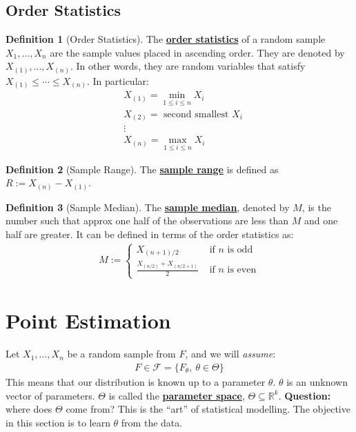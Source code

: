 \documentclass[11pt]{scrartcl}
\newcommand{\R}[0]{\mathbb{R}}
\theoremstyle{definition}
\newtheorem{definition}{Definition}
\theoremstyle{remark}
\newcommand{\dfn}[1]{\textbf{\underline{#1}}}
\newcommand{\dist}[0]{\mathcal{F}}
\begin{document}
{\subsection{Order Statistics}
\begin{definition}[Order Statistics]
	The \dfn{order statistics} of a random sample $X_1, ..., X_n$ are the sample values placed in ascending order. They are denoted by $X_{(1)}, ..., X_{(n)}$. In other words, they are random variables that satisfy $X_{(1)} \leq \cdots \leq X_{(n)}$. In particular: 
	\begin{align*}
		& X_{(1)} = \min_{1 \leq i \leq n} X_i \\
		& X_{(2)} = \text{ second smallest } X_i \\
		& \vdots 	\\
		& X_{(n)} = \max_{1 \leq i \leq n } X_i 
	\end{align*}
\end{definition}


\begin{definition}[Sample Range]
	The \dfn{sample range} is defined as $R:= X_{(n)} - X_{(1)}$. 
\end{definition}

\begin{definition}[Sample Median]
	The \dfn{sample median}, denoted by $M$, is the number such that approx one half of the observations are less than $M$ and one half are greater. It can be defined in terms of the order statistics as: 
	\begin{align*}
		M := \begin{cases}
			X_{(n+1)/2} & \text{ if $n$ is odd} \\
			\frac{X_{(n/2)} + X_{(n/2+1)}}{2} & \text{ if $n$ is even}
		\end{cases}	
	\end{align*}
\end{definition}

\section{Point Estimation}
Let $X_1, ..., X_n$ be a random sample from $F$, and we will \emph{assume}: 
\begin{align*}
F \in \dist = \{ F_\theta,\ \theta \in \Theta \} 
\end{align*}
This means that our distribution is known up to a parameter $\theta$. $\theta$ is an unknown vector of parameters. $\Theta$ is called the \dfn{parameter space}, $\Theta \subseteq \R^k$. \textbf{Question:} where does $\Theta$ come from? This is the ``art'' of statistical modelling. The objective in this section is to learn $\theta$ from the data. 


}
\end{document}
